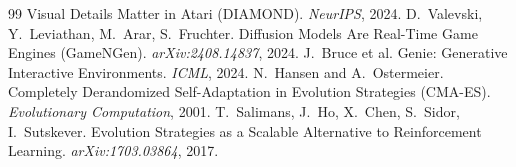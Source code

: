 \documentclass[11pt]{article}
\begin{document}
\begin{thebibliography}{99}
Visual Details Matter in Atari (DIAMOND). \emph{NeurIPS}, 2024.
 D.~Valevski, Y.~Leviathan, M.~Arar, S.~Fruchter. Diffusion Models Are Real-Time Game
Engines (GameNGen). \emph{arXiv:2408.14837}, 2024.
 J.~Bruce et al. Genie: Generative Interactive Environments. \emph{ICML}, 2024.
 N.~Hansen and A.~Ostermeier. Completely Derandomized Self-Adaptation in Evolution
Strategies (CMA-ES). \emph{Evolutionary Computation}, 2001.
 T.~Salimans, J.~Ho, X.~Chen, S.~Sidor, I.~Sutskever. Evolution Strategies as a
Scalable Alternative to Reinforcement Learning. \emph{arXiv:1703.03864}, 2017.
\end{thebibliography}
\end{document}
